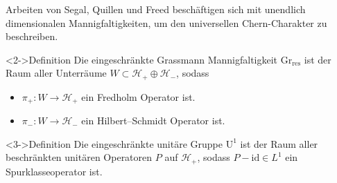 \documentclass[12pt,utf8,notheorems,compress,t]{beamer}
\renewcommand{\_}{\mathpunct{.}}
\newcommand{\?}{\,{:}\,}
\begin{document}
\begin{frame}
    Arbeiten von Segal, Quillen und Freed beschäftigen sich mit unendlich
    dimensionalen Mannigfaltigkeiten, um den universellen Chern-Charakter zu
    beschreiben.
    \begin{block}<2->{Definition}
        Die eingeschränkte Grassmann Mannigfaltigkeit
        $\mathrm{Gr}_{\mathrm{res}}$ ist der Raum aller Unterräume $W\subset
        \mathcal{H}_+ \oplus \mathcal{H}_-$, sodass 
        \begin{itemize}
            \item $\pi_+\colon W\to \mathcal{H}_+$ ein Fredholm Operator ist.
            \item $\pi_-\colon W \to \mathcal{H}_-$ ein Hilbert--Schmidt
                Operator ist.
        \end{itemize}
    \end{block}
    \begin{block}<3->{Definition}
        Die eingeschränkte unitäre Gruppe $\mathrm U^1$ ist der Raum aller
        beschränkten
        unitären Operatoren $P$ auf $\mathcal{H}_+$, sodass $P-\mathrm{id}\in
        L^1$ ein Spurklasseoperator ist.
    \end{block}
\end{frame}
\end{document}
